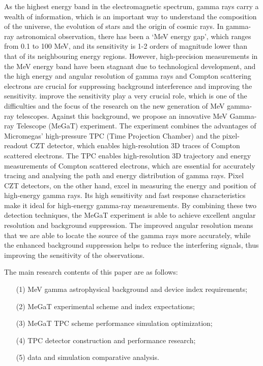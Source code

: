 \begin{enabstract}
	\linespread{1.5}
	
	As the highest energy band in the electromagnetic spectrum, gamma rays carry a wealth of information, which is an important way to understand the composition of the universe, the evolution of stars and the origin of cosmic rays.
	In gamma-ray astronomical observation, there has been a ‘MeV energy gap’, which ranges from 0.1 to 100 MeV, and its sensitivity is 1-2 orders of magnitude lower than that of its neighbouring energy regions.
	However, high-precision measurements in the MeV energy band have been stagnant due to technological development, and the high energy and angular resolution of gamma rays and Compton scattering electrons are crucial for suppressing background interference and improving the sensitivity.
	improve the sensitivity play a very crucial role, which is one of the difficulties and the focus of the research on the new generation of MeV gamma-ray telescopes. Against this background, we propose an innovative
	MeV Gamma-ray Telescope (MeGaT) experiment. The experiment combines the advantages of Micromegas' high-pressure TPC (Time Projection Chamber) and the pixel-readout CZT detector, which enables high-resolution 3D traces of Compton scattered electrons.
	The TPC enables high-resolution 3D trajectory and energy measurements of Compton scattered electrons, which are essential for accurately tracing and analysing the path and energy distribution of gamma rays. Pixel CZT detectors, on the other hand, excel in measuring the energy and position of high-energy gamma rays.
	Its high sensitivity and fast response characteristics make it ideal for high-energy gamma-ray measurements. By combining these two detection techniques, the MeGaT experiment is able to achieve excellent angular resolution and background suppression.
	The improved angular resolution means that we are able to locate the source of the gamma rays more accurately, while the enhanced background suppression helps to reduce the interfering signals, thus improving the sensitivity of the observations.\par
	The main research contents of this paper are as follows:


\begin{enumerate}
\item[(1)] MeV gamma astrophysical background and device index requirements;
\item[(2)] MeGaT experimental scheme and index expectations;
\item[(3)] MeGaT TPC scheme performance simulation optimization;	
\item[(4)] TPC detector construction and performance research;
\item[(5)] data and simulation comparative analysis.
\end{enumerate}  
 

\end{enabstract}
